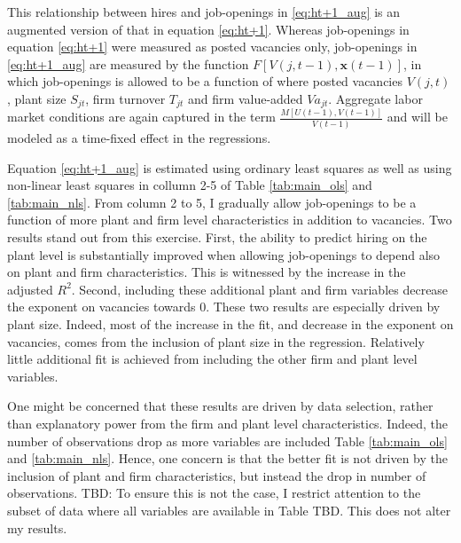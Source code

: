 This relationship between hires and job-openings in \eqref{eq:ht+1_aug} is an augmented version of that in equation \eqref{eq:ht+1}. Whereas job-openings in equation \eqref{eq:ht+1} were measured as posted vacancies only, job-openings in \eqref{eq:ht+1_aug} are measured by the function $F\left[ V(j,t-1), \mathbf{x}(t-1) \right]$, in which job-openings is allowed to be a function of where posted vacancies $V(j,t)$, plant size  $S_{jt}$, firm turnover $T_{jt}$ and firm value-added  $Va_{jt}$. Aggregate labor market conditions are again captured in the term $\frac{M\left[U(t-1), V(t-1)\right]}{V(t-1)}$ and will be modeled as a time-fixed effect in the regressions.

Equation \eqref{eq:ht+1_aug} is estimated using ordinary least squares as well as using non-linear least squares in collumn 2-5 of Table \ref{tab:main_ols} and \ref{tab:main_nls}. From column 2 to 5, I gradually allow job-openings to be a function of more plant and firm level characteristics in addition to vacancies. Two results stand out from this exercise. First, the ability to predict hiring on the plant level is substantially improved when allowing job-openings to depend also on plant and firm characteristics. This is witnessed by the increase in the adjusted $R^2$. Second, including these additional plant and firm variables decrease the exponent on vacancies towards $0$. These two results are especially driven by plant size. Indeed, most of the increase in the fit, and decrease in the exponent on vacancies, comes from the inclusion of plant size in the regression. Relatively little additional fit is achieved from including the other firm and plant level variables. 

One might be concerned that these results are driven by data selection, rather than explanatory power from the firm and plant level characteristics. Indeed, the number of observations drop as more variables are included Table \ref{tab:main_ols} and \ref{tab:main_nls}. Hence, one concern is that the better fit is not driven by the inclusion of  plant and firm characteristics, but instead the drop in number of observations. TBD: To ensure this is not the case, I restrict attention to the subset of data where all variables are available in Table TBD. This does not alter my results. 

